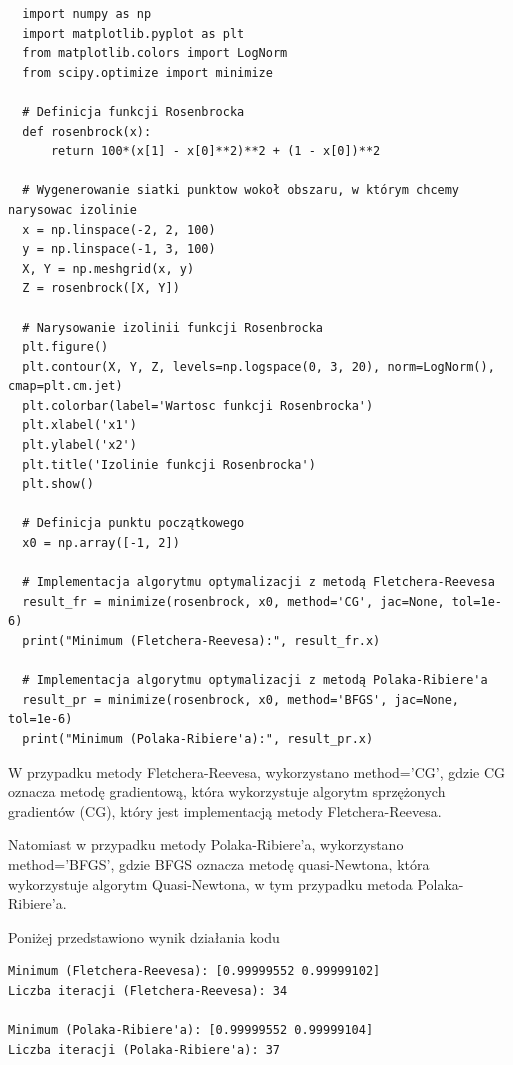 \documentclass{article}
\begin{document}
\begin{lstlisting}
  import numpy as np
  import matplotlib.pyplot as plt
  from matplotlib.colors import LogNorm
  from scipy.optimize import minimize
  
  # Definicja funkcji Rosenbrocka
  def rosenbrock(x):
      return 100*(x[1] - x[0]**2)**2 + (1 - x[0])**2
  
  # Wygenerowanie siatki punktow wokoł obszaru, w którym chcemy narysowac izolinie
  x = np.linspace(-2, 2, 100)
  y = np.linspace(-1, 3, 100)
  X, Y = np.meshgrid(x, y)
  Z = rosenbrock([X, Y])
  
  # Narysowanie izolinii funkcji Rosenbrocka
  plt.figure()
  plt.contour(X, Y, Z, levels=np.logspace(0, 3, 20), norm=LogNorm(), cmap=plt.cm.jet)
  plt.colorbar(label='Wartosc funkcji Rosenbrocka')
  plt.xlabel('x1')
  plt.ylabel('x2')
  plt.title('Izolinie funkcji Rosenbrocka')
  plt.show()
  
  # Definicja punktu początkowego
  x0 = np.array([-1, 2])
  
  # Implementacja algorytmu optymalizacji z metodą Fletchera-Reevesa
  result_fr = minimize(rosenbrock, x0, method='CG', jac=None, tol=1e-6)
  print("Minimum (Fletchera-Reevesa):", result_fr.x)
  
  # Implementacja algorytmu optymalizacji z metodą Polaka-Ribiere'a
  result_pr = minimize(rosenbrock, x0, method='BFGS', jac=None, tol=1e-6)
  print("Minimum (Polaka-Ribiere'a):", result_pr.x)
\end{lstlisting}  

W przypadku metody Fletchera-Reevesa, wykorzystano method='CG', gdzie CG oznacza metodę gradientową, 
która wykorzystuje algorytm sprzężonych gradientów (CG), który jest implementacją metody Fletchera-Reevesa.

Natomiast w przypadku metody Polaka-Ribiere'a, wykorzystano method='BFGS', gdzie BFGS oznacza metodę quasi-Newtona, 
która wykorzystuje algorytm Quasi-Newtona, w tym przypadku metoda Polaka-Ribiere'a.

Poniżej przedstawiono wynik działania kodu

\begin{lstlisting}
Minimum (Fletchera-Reevesa): [0.99999552 0.99999102]
Liczba iteracji (Fletchera-Reevesa): 34

Minimum (Polaka-Ribiere'a): [0.99999552 0.99999104]
Liczba iteracji (Polaka-Ribiere'a): 37
\end{lstlisting}
\end{document}
